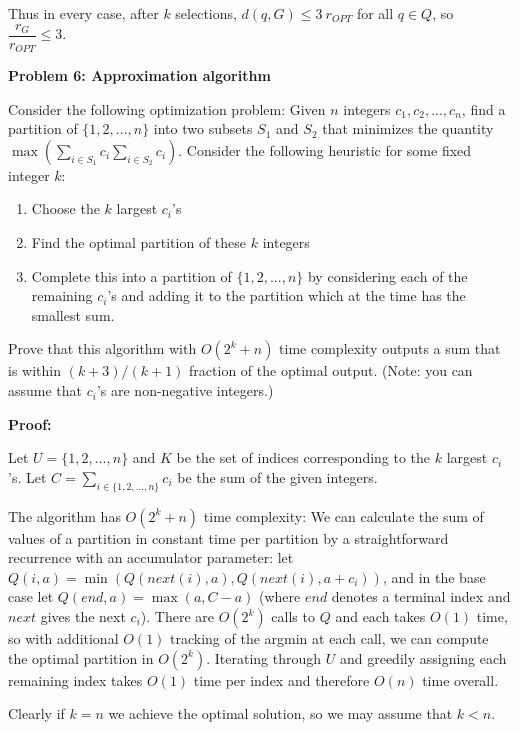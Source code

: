 \documentclass[letterpaper,12pt]{article}
\begin{document}
Thus in every case, after $k$ selections, $d(q, G) \leq 3\ r_{OPT}$ for all $q \in
Q$, so $\dfrac{r_G}{r_{OPT}} \leq 3$.




\pagebreak

\noindent\textbf{Problem 6: Approximation algorithm}

Consider the following optimization problem: Given $n$ integers $c_1, c_2, ...,
c_n$, find a partition of $\{1,2,...,n\}$ into two subsets $S_1$ and $S_2$ that
minimizes the quantity $\max (\sum_{i \in S_1} c_i \sum_{i \in S_2} c_i)$. Consider the
following heuristic for some fixed integer $k$:

\begin{enumerate}
  \item Choose the $k$ largest $c_i$'s
  \item Find the optimal partition of these $k$ integers
  \item Complete this into a partition of $\{1,2,...,n\}$ by considering each of
    the remaining $c_i$'s and adding it to the partition which at the time has
    the smallest sum.
\end{enumerate}

Prove that this algorithm with $O(2^k + n)$ time complexity outputs a sum that
is within $(k + 3) / (k + 1)$ fraction of the optimal output. (Note: you can
assume that $c_i$'s are non-negative integers.)

\vspace{2mm}
\textbf{Proof:}

Let $U = \{1,2,...,n\}$ and $K$ be the set of indices corresponding to the $k$
largest $c_i$'s. Let $C = \sum_{i \in \{1,2,...,n\}} c_i$ be the sum of the given
integers.

The algorithm has $O(2^k + n)$ time complexity: We can calculate the sum of
values of a partition in constant time per partition by a straightforward
recurrence with an accumulator parameter: let $Q(i, a) = \min(Q(next(i), a),
Q(next(i), a + c_i))$, and in the base case let $Q(end, a) = \max(a, C - a)$
(where $end$ denotes a terminal index and $next$ gives the next $c_i$). There
are $O(2^k)$ calls to $Q$ and each takes $O(1)$ time, so with additional $O(1)$
tracking of the argmin at each call, we can compute the optimal partition in
$O(2^k)$. Iterating through $U$ and greedily assigning each remaining index
takes $O(1)$ time per index and therefore $O(n)$ time overall.

Clearly if $k = n$ we achieve the optimal solution, so we may assume that $k <
n$.
\end{document}
